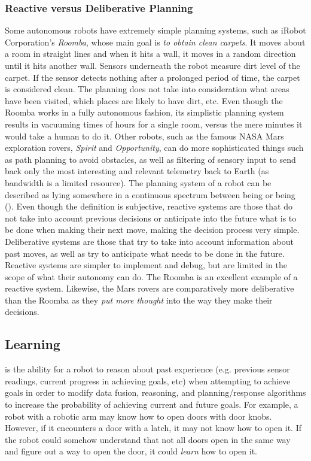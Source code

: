 \subsubsection{Reactive versus Deliberative Planning}
Some autonomous robots have extremely simple planning systems, such as iRobot Corporation's \textit{Roomba}, whose main goal is \textit{to obtain clean carpets}. It moves about a room in straight lines and when it hits a wall, it moves in a random direction until it hits another wall. Sensors underneath the robot measure dirt level of the carpet. If the sensor detects nothing after a prolonged period of time, the carpet is considered clean. The planning does not take into consideration what areas have been visited, which places are likely to have dirt, etc. Even though the Roomba works in a fully autonomous fashion, its simplistic planning system results in vacuuming times of hours for a single room, versus the mere minutes it would take a human to do it. Other robots, such as the famous NASA Mars exploration rovers, \textit{Spirit} and \textit{Opportunity}, can do more sophisticated things such as path planning to avoid obstacles, as well as filtering of sensory input to send back only the most interesting and relevant telemetry back to Earth (as bandwidth is a limited resource). The planning system of a robot can be described as lying somewhere in a continuous spectrum between being  or being  (). Even though the definition is subjective, reactive systems are those that do not take into account previous decisions or anticipate into the future what is to be done when making their next move, making the decision process very simple. Deliberative systems are those that try to take into account information about past moves, as well as try to anticipate what needs to be done in the future. Reactive systems are simpler to implement and debug, but are limited in the scope of what their autonomy can do. The Roomba is an excellent example of a reactive system. Likewise, the Mars rovers are comparatively more deliberative than the Roomba as they \textit{put more thought} into the way they make their decisions.

\subsection{Learning}
 is the ability for a robot to reason about past experience (e.g. previous sensor readings, current progress in achieving goals, etc) when attempting to achieve goals in order to modify data fusion, reasoning, and planning/response algorithms to increase the probability of achieving current and future goals. For example, a robot with a robotic arm may know how to open doors with door knobs. However, if it encounters a door with a latch, it may not know how to open it. If the robot could somehow understand that not all doors open in the same way and figure out a way to open the door, it could \textit{learn} how to open it.

